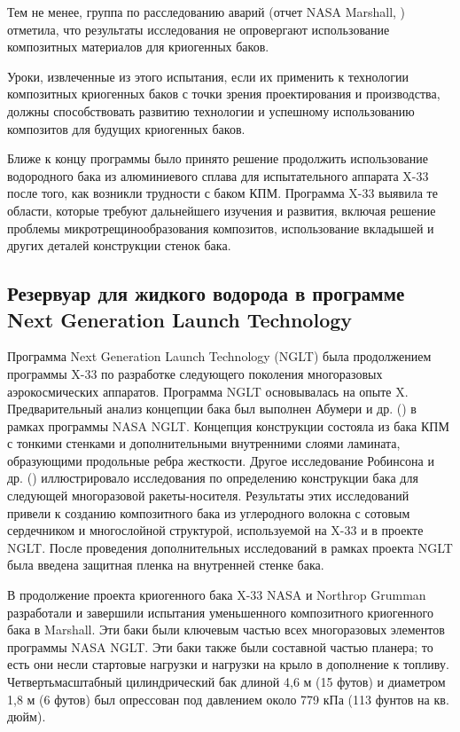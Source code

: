 Тем не менее, группа по расследованию аварий (отчет NASA Marshall, \cite{nasamarshall2000}) отметила, что результаты исследования не опровергают использование композитных материалов для криогенных баков. 


Уроки, извлеченные из этого испытания, если их применить к технологии композитных криогенных баков с точки зрения проектирования и производства, должны способствовать развитию технологии и успешному использованию композитов для будущих криогенных баков. 

 Ближе к концу программы было принято решение продолжить использование водородного бака из алюминиевого сплава для испытательного аппарата X-33 после того, как возникли трудности с баком КПМ. Программа X-33 выявила те области, которые требуют дальнейшего изучения и развития, включая решение проблемы микротрещинообразования композитов, использование вкладышей и других деталей конструкции стенок бака.

\subsection{Резервуар для жидкого водорода в программе Next Generation Launch Technology}\label{ch:overview:1:sec3:sub7}

Программа Next Generation Launch Technology (NGLT) была продолжением программы X-33 по разработке следующего поколения многоразовых аэрокосмических аппаратов. Программа NGLT основывалась на опыте X. Предварительный анализ концепции бака был выполнен Абумери и др. (\cite{abumeri2004}) в рамках программы NASA NGLT. Концепция конструкции состояла из бака КПМ с тонкими стенками и дополнительными внутренними слоями ламината, образующими продольные ребра жесткости. Другое исследование Робинсона и др. (\cite{robinson2004}) иллюстрировало исследования по определению конструкции бака для следующей многоразовой ракеты-носителя. Результаты этих исследований привели к созданию композитного бака из углеродного волокна с сотовым сердечником и многослойной структурой, используемой на X-33 и в проекте NGLT. После проведения дополнительных исследований в рамках проекта NGLT была введена защитная пленка на внутренней стенке бака.

В продолжение проекта криогенного бака X-33 NASA и Northrop Grumman разработали и завершили испытания уменьшенного композитного криогенного бака в Marshall. Эти баки были ключевым частью всех многоразовых элементов программы NASA NGLT. Эти баки также были составной частью планера; то есть они несли стартовые нагрузки и нагрузки на крыло в дополнение к топливу. Четвертьмасштабный цилиндрический бак длиной 4,6 м (15 футов) и диаметром 1,8 м (6 футов) был опрессован под давлением около 779 кПа (113 фунтов на кв. дюйм).

